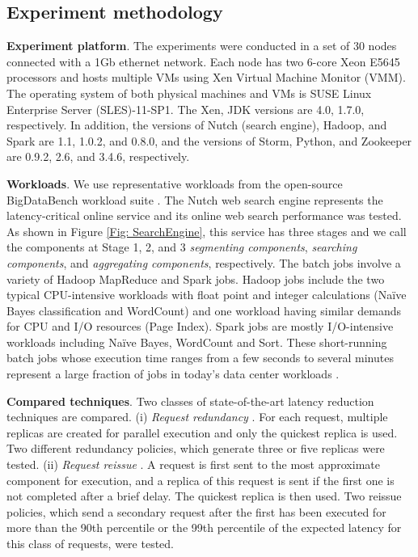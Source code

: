 \documentclass[10pt, conference, compsocconf]{IEEEtran}
\begin{document}
\subsection{Experiment methodology} \label{Section: Experiment methodology}
\textbf{Experiment platform}. The experiments were conducted in a set of 30 nodes connected with a 1Gb ethernet network. Each node has two 6-core Xeon E5645 processors and hosts multiple VMs using Xen Virtual Machine Monitor (VMM). The operating system of both physical machines and VMs is SUSE Linux Enterprise Server (SLES)-11-SP1. The Xen, JDK versions are 4.0, 1.7.0, respectively. In addition, the versions of Nutch (search engine), Hadoop, and Spark are 1.1, 1.0.2, and 0.8.0, and the versions of Storm, Python, and Zookeeper are 0.9.2, 2.6, and 3.4.6, respectively.



\textbf{Workloads}. We use representative workloads from the open-source BigDataBench workload suite \cite{opensourceBigDataBench}. The Nutch web search engine \cite{nutchsearch} represents the latency-critical online service and its online web search performance was tested. As shown in Figure \ref{Fig: SearchEngine}, this service has three stages and we call the components at Stage 1, 2, and 3 \emph{segmenting components}, \emph{searching components}, and \emph{aggregating components}, respectively.
The batch jobs involve a variety of Hadoop MapReduce and Spark jobs.
Hadoop jobs include the two typical CPU-intensive workloads with float point and integer calculations (Na\"{i}ve Bayes classification and WordCount) and one workload having similar demands for CPU and I/O resources (Page Index).
Spark jobs are mostly I/O-intensive workloads including Na\"{i}ve Bayes, WordCount and Sort.
These short-running batch jobs whose execution time ranges from a few seconds to several minutes represent a large fraction of jobs in today's data center workloads \cite{reiss2012heterogeneity,chen2012interactive}.




















\textbf{Compared techniques}.
Two classes of state-of-the-art latency reduction techniques are compared. (i) \emph{Request redundancy} \cite{vulimiri2012more, ananthanarayanan2013effective,stewart2013zoolander}. For each request, multiple replicas are created for parallel execution and only the quickest replica is used. Two different redundancy policies, which generate three or five replicas were tested. (ii) \emph{Request reissue} \cite{jalaparti2013speeding,tailatScale}. A request is first sent to the most approximate component for execution, and a replica of this request is sent if the first one is not completed after a brief delay. The quickest replica is then used. Two reissue policies, which send a secondary request after the first has been executed for more than the 90th percentile or the 99th percentile of the expected latency for this class of requests, were tested.
\end{document}
